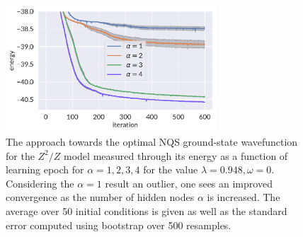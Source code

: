 	\begin{figure}[H]
		\centering
		\includegraphics[width=0.7\textwidth]{figures/chapter3/energyvsepoch.pdf}
		\caption{The approach towards the optimal NQS ground-state wavefunction for the $Z^2/Z$ model measured through its energy as a function of learning epoch for $\alpha=1, 2, 3, 4$ for the value $\lambda=0.948, \omega=0$. Considering the $\alpha=1$ result an outlier, one sees an improved convergence as the number of hidden nodes $\alpha$ is increased. The average over 50 initial conditions is given as well as the standard error computed using bootstrap over 500 resamples.
		}
		\label{fig:DeltaE-gs}
	\end{figure}
	
